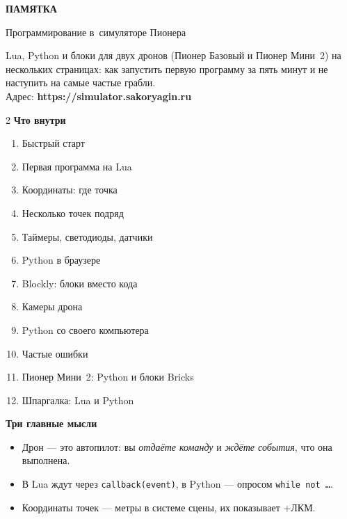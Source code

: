 \documentclass[11pt,a4paper]{article}
\newcommand{\key}[1]{{\setlength{\fboxsep}{1.5pt}\fcolorbox{codeframe}{codebg}{\small\ttfamily #1}}}
\begin{document}
\begin{tcolorbox}[enhanced, colback=ink, colframe=ink, arc=4pt, left=14pt, right=14pt, top=12pt, bottom=12pt]
    {\color{accent}\small\bfseries ПАМЯТКА}\\[2pt]
    {\color{white}\huge\bfseries\raggedright{} Программирование в~симуляторе Пионера\par}\vspace{6pt}
    {\color{white!80!black}Lua, Python и блоки для двух дронов (Пионер Базовый и Пионер Мини~2) на нескольких страницах:
    как запустить первую программу за пять минут и не наступить на самые частые грабли.\\[4pt]
    Адрес: \textbf{\color{white}https://simulator.sakoryagin.ru}}
\end{tcolorbox}

\begin{multicols}{2}
\small
\textbf{Что внутри}
\begin{enumerate}[leftmargin=*,itemsep=0pt]
    \item Быстрый старт
    \item Первая программа на Lua
    \item Координаты: где точка
    \item Несколько точек подряд
    \item Таймеры, светодиоды, датчики
    \item Python в браузере
    \item Blockly: блоки вместо кода
    \item Камеры дрона
    \item Python со своего компьютера
    \item Частые ошибки
    \item Пионер Мини~2: Python и блоки Bricks
    \item Шпаргалка: Lua и Python
\end{enumerate}
\columnbreak

\textbf{Три главные мысли}
\begin{itemize}[leftmargin=*,itemsep=2pt]
    \item Дрон — это автопилот: вы \emph{отдаёте команду} и \emph{ждёте события}, что она выполнена.
    \item В Lua ждут через \texttt{callback(event)}, в Python — опросом \texttt{while not \dots}.
    \item Координаты точек — метры в системе сцены, их показывает \key{Ctrl}+ЛКМ.
\end{itemize}
\end{multicols}
\end{document}
